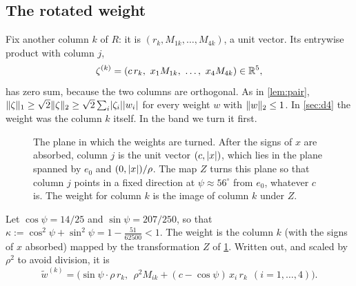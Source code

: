 \documentclass[11pt,a4paper]{article}
\begin{document}
\subsection{The rotated weight}
Fix another column $k$ of $R$: it is $(r_k,M_{1k},\dots,M_{4k})$, a unit vector. Its entrywise product with column $j$,
\[
\zeta^{(k)}=(c\,r_k,\ x_1M_{1k},\ \dots,\ x_4M_{4k})\in\R^5,
\]
has zero sum, because the two columns are orthogonal. As in \cref{lem:pair}, $\lVert \zeta\rVert_1\ge\sqrt2\lVert \zeta\rVert_2\ge\sqrt2\sum_i\lvert \zeta_i\rvert\lvert w_i\rvert$ for every weight $w$ with $\lVert w\rVert_2\le1$. In \cref{sec:d4} the weight was the column $k$ itself. In the band we turn it first.

\begin{figure}[t]
\centering
{}
\caption{The plane in which the weights are turned. After the signs of $x$ are absorbed, column $j$ is the unit vector $(c,\lvert x\rvert)$, which lies in the plane spanned by $e_0$ and $(0,\lvert x\rvert)/\rho$. The map $Z$ turns this plane so that column $j$ points in a fixed direction at $\psi\approx56^\circ$ from $e_0$, whatever $c$ is. The weight for column $k$ is the image of column $k$ under $Z$.}
\label{fig:rotation}
\end{figure}

Let $\cos\psi=14/25$ and $\sin\psi=207/250$, so that $\kappa:=\cos^2\psi+\sin^2\psi=1-\frac{51}{62500}<1$. The weight is the column $k$ (with the signs of $x$ absorbed) mapped by the transformation $Z$ of \cref{fig:rotation}. Written out, and scaled by $\rho^2$ to avoid division, it is
\begin{equation}\label{eq:weight}
\tilde w^{(k)}=\bigl(\sin\psi\cdot\rho\, r_k,\ \ \rho^2M_{ik}+(c-\cos\psi)\,x_i\,r_k\ \ (i=1,\dots,4)\bigr).
\end{equation}
\end{document}
